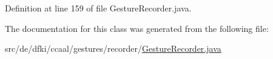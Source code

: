 Definition at line 159 of file Gesture\-Recorder.\-java.



The documentation for this class was generated from the following file\-:\begin{DoxyCompactItemize}
\item 
src/de/dfki/ccaal/gestures/recorder/\hyperlink{_gesture_recorder_8java}{Gesture\-Recorder.\-java}\end{DoxyCompactItemize}
